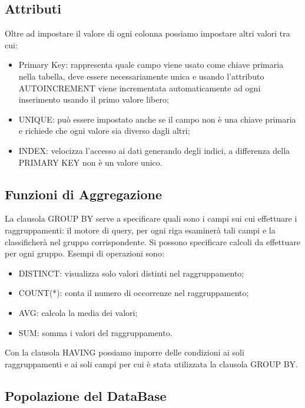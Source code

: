 \subsection{Attributi}

Oltre ad impostare il valore di ogni colonna possiamo impostare altri valori tra cui:

\begin{itemize}

\item{Primary Key}: rappresenta quale campo viene usato come chiave primaria nella tabella, deve essere necessariamente unica e usando l’attributo AUTOINCREMENT viene incrementata automaticamente ad ogni inserimento usando il primo valore libero;
\item{UNIQUE}: può essere impostato anche se il campo non è una chiave primaria e richiede che ogni valore sia diverso dagli altri;
\item{INDEX}: velocizza l’accesso ai dati generando degli indici, a differenza della PRIMARY KEY non è un valore unico.

\end{itemize}

\subsection{Funzioni di Aggregazione}

La clausola GROUP BY serve a specificare quali sono i campi sui cui effettuare i raggruppamenti: il motore di query, per ogni riga esaminerà tali campi e la classificherà nel gruppo corrispondente. Si possono specificare calcoli da effettuare per ogni gruppo. Esempi di operazioni sono:

\begin{itemize}

\item{DISTINCT}: visualizza solo valori distinti nel raggruppamento;
\item{COUNT(*)}: conta il numero di occorrenze nel raggruppamento;
\item{AVG}: calcola la media dei valori;
\item{SUM}: somma i valori del raggruppamento. 

\end{itemize}

Con la clausola HAVING possiamo imporre delle condizioni ai soli raggruppamenti e ai soli campi per cui è stata utilizzata la clausola GROUP BY.

\subsection{Popolazione del DataBase}

